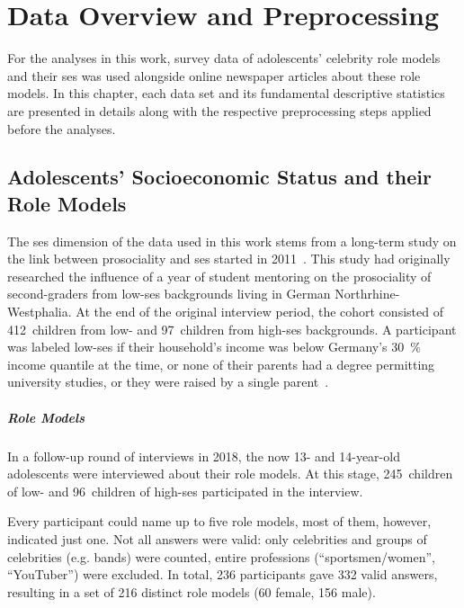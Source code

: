 \renewcommand{\imagepath}{../30-data/img}

\chapter{Data Overview and Preprocessing}
For the analyses in this work, survey data of adolescents' celebrity role models and their \gls{ses} was used alongside online newspaper articles about these role models. In this chapter, each data set and its fundamental descriptive statistics are presented in details along with the respective preprocessing steps applied before the analyses.

\section{Adolescents' Socioeconomic Status and their Role Models}
The \gls{ses} dimension of the data used in this work stems from a long-term study on the link between prosociality and \gls{ses} started in 2011~\autocite{kosse_formation_2020}. This study had originally researched the influence of a year of student mentoring on the prosociality of second-graders from low-\gls{ses} backgrounds living in German Northrhine-Westphalia. At the end of the original interview period, the cohort consisted of \SI{412}{children} from low- and \SI{97}{children} from high-\gls{ses} backgrounds. A participant was labeled low-\gls{ses} if their household's income was below Germany's \SI{30}{\percent} income quantile at the time, or none of their parents had a degree permitting university studies, or they were raised by a single parent~\autocite{kosse_formation_2020}.

\paragraph{Role Models}
In a follow-up round of interviews in 2018, the now 13- and 14-year-old adolescents were interviewed about their role models. At this stage, \SI{245}{children} of low- and \SI{96}{children} of high-\gls{ses} participated in the interview.

Every participant could name up to five role models, most of them, however, indicated just one. Not all answers were valid: only celebrities and groups of celebrities (e.g. bands) were counted, entire professions (``sportsmen/women'', ``YouTuber'') were excluded. In total, \SI{236}{} participants gave \SI{332}{} valid answers, resulting in a set of \SI{216}{} distinct role models (\SI{60}{} female, \SI{156}{} male).

